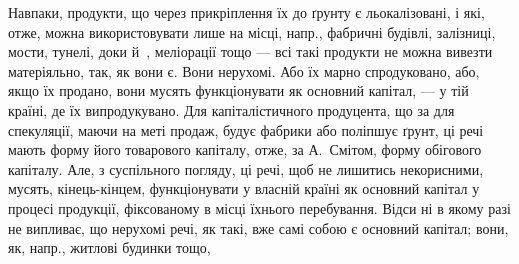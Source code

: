 Навпаки, продукти, що через прикріплення їх до ґрунту є льокалізовані,
і які, отже, можна використовувати лише на місці, напр., фабричні
будівлі, залізниці, мости, тунелі, доки й~, меліорації тощо —
всі такі продукти не можна вивезти матеріяльно, так, як вони є. Вони
нерухомі. Або їх марно спродуковано, або, якщо їх продано, вони мусять
функціонувати як основний капітал, — у тій країні, де їх випродукувано.
Для капіталістичного продуцента, що за для спекуляції, маючи
на меті продаж, будує фабрики або поліпшує ґрунт, ці речі мають форму
його товарового капіталу, отже, за А.~Смітом, форму обігового капіталу.
Але, з суспільного погляду, ці речі, щоб не лишитись некорисними,
мусять, кінець-кінцем, функціонувати у власній країні як основний
капітал у процесі продукції, фіксованому в місці їхнього перебування. Відси
ні в якому разі не випливає, що нерухомі речі, як такі, вже самі
собою є основний капітал; вони, як, напр., житлові будинки тощо,
\parbreak{}  %
